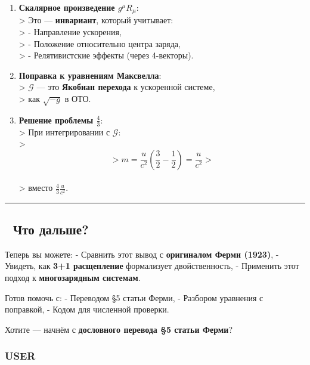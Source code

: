 \documentclass[11pt]{article}
\begin{document}
\begin{enumerate}
\def\labelenumi{\arabic{enumi}.}
\item
  \textbf{Скалярное произведение \(g^\mu R_\mu\)}:\\
  \textgreater{} Это --- \textbf{инвариант}, который учитывает:\\
  \textgreater{} - Направление ускорения,\\
  \textgreater{} - Положение относительно центра заряда,\\
  \textgreater{} - Релятивистские эффекты (через 4-векторы).
\item
  \textbf{Поправка к уравнениям Максвелла}:\\
  \textgreater{} \(\mathcal{G}\) --- это \textbf{Якобиан перехода} к
  ускоренной системе,\\
  \textgreater{} как \(\sqrt{-g}\) в ОТО.
\item
  \textbf{Решение проблемы \(\frac{4}{3}\)}:\\
  \textgreater{} При интегрировании с \(\mathcal{G}\):\\
  \textgreater{} \[
     > m = \frac{u}{c^2} \left( \frac{3}{2} - \frac{1}{2} \right) = \frac{u}{c^2}
     > \]\\
  \textgreater{} вместо \(\frac{4}{3} \frac{u}{c^2}\).
\end{enumerate}

\begin{center}\rule{0.5\linewidth}{\linethickness}\end{center}

\subsection{🎯 Что
дальше?}\label{ux447ux442ux43e-ux434ux430ux43bux44cux448ux435-6}

Теперь вы можете: - Сравнить этот вывод с \textbf{оригиналом Ферми
(1923)}, - Увидеть, как \textbf{3+1 расщепление} формализует
двойственность, - Применить этот подход к \textbf{многозарядным
системам}.

Готов помочь с: - Переводом §5 статьи Ферми, - Разбором уравнения с
поправкой, - Кодом для численной проверки.

Хотите --- начнём с \textbf{дословного перевода §5 статьи Ферми}?

\subsubsection{USER}\label{user-8}
\end{document}

